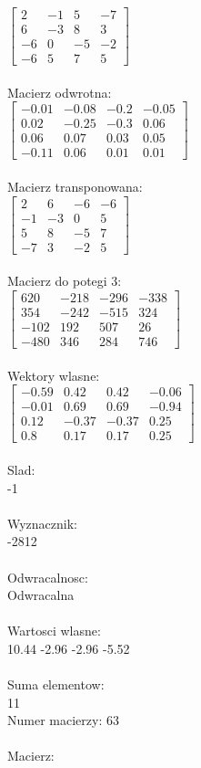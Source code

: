 \documentclass[a4paper,12pt]{article}
\begin{document}
$\begin{bmatrix} 2&-1&5&-7\\6&-3&8&3\\-6&0&-5&-2\\-6&5&7&5 \end{bmatrix}$
\\
\\
Macierz odwrotna:\\

$\begin{bmatrix} -0.01&-0.08&-0.2&-0.05\\0.02&-0.25&-0.3&0.06\\0.06&0.07&0.03&0.05\\-0.11&0.06&0.01&0.01 \end{bmatrix}$
\\
\\
Macierz transponowana:\\

$\begin{bmatrix} 2&6&-6&-6\\-1&-3&0&5\\5&8&-5&7\\-7&3&-2&5 \end{bmatrix}$
\\
\\
Macierz do potegi 3:\\

$\begin{bmatrix} 620&-218&-296&-338\\354&-242&-515&324\\-102&192&507&26\\-480&346&284&746 \end{bmatrix}$
\\
\\
Wektory wlasne:\\

$\begin{bmatrix} -0.59&0.42&0.42&-0.06\\-0.01&0.69&0.69&-0.94\\0.12&-0.37&-0.37&0.25\\0.8&0.17&0.17&0.25 \end{bmatrix}$
\\
\\
Slad:\\
-1
\\
\\
Wyznacznik:\\
-2812
\\
\\
Odwracalnosc:\\
Odwracalna
\\
\\
Wartosci wlasne:\\
10.44 -2.96 -2.96 -5.52
\\
\\
Suma elementow:\\
11
\\
\newpage
Numer macierzy:
63
\\
\\
Macierz:\\
\end{document}
